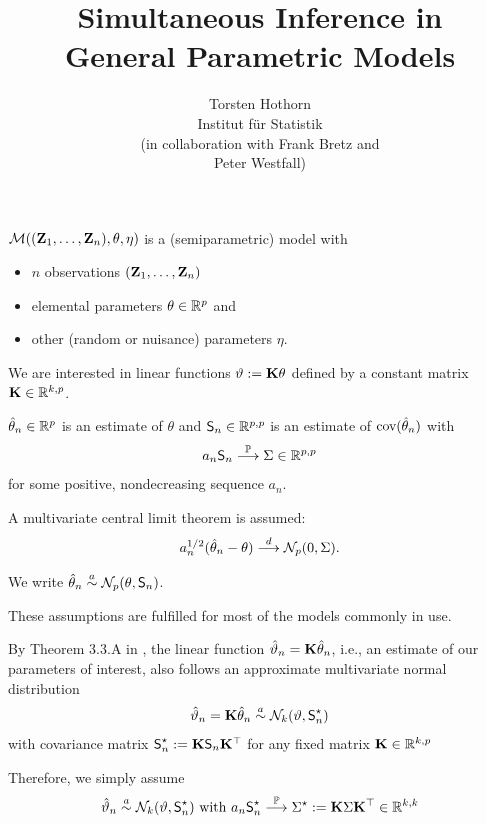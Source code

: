 \documentclass[landscape]{slides}
\title{Simultaneous Inference in \\ General Parametric Models}
\author{Torsten Hothorn \\ Institut für Statistik \\ 
(in collaboration with Frank Bretz and \\ Peter Westfall)}
\begin{document}
\maketitle



$\mathcal{M}((\mathbf{Z}_1, \dots, \mathbf{Z}_n), \theta, \eta)$ is a (semiparametric) model with

\begin{itemize}
\item $n$ observations $(\mathbf{Z}_1, \dots, \mathbf{Z}_n)$
\item elemental parameters $\theta \in \mathbb{R}^p$ and
\item other (random or nuisance) parameters $\eta$.
\end{itemize}

We are interested in linear functions $\vartheta := \mathbf{K} \theta$ defined
by a constant matrix $\mathbf{K} \in \mathbb{R}^{k, p}$.


$\hat{\theta}_n \in \mathbb{R}^p$ is an estimate of $\theta$ and
$\textsf{S}_n \in \mathbb{R}^{p,p}$ is an estimate of $\text{cov}(\hat{\theta}_n)$ with
\begin{eqnarray*}
a_n \textsf{S}_n \stackrel{\mathbb{P}}{\longrightarrow} \Sigma \in \mathbb{R}^{p,p}
\end{eqnarray*}
for some positive, nondecreasing sequence $a_n$.

A multivariate central limit theorem is assumed:
\begin{eqnarray*}
a_n^{1/2} (\hat{\theta}_n - \theta) \stackrel{d}{\longrightarrow} \mathcal{N}_p(0, \Sigma).
\end{eqnarray*}

We write $\hat{\theta}_n \stackrel{a}{\sim} \mathcal{N}_p(\theta, \textsf{S}_n)$.

These assumptions are fulfilled for most of the models commonly in use.


By Theorem 3.3.A in
\cite{Serfling1980}, the linear function $\hat{\vartheta}_n = \mathbf{K} 
\hat{\theta}_n$, i.e., an estimate of our parameters of interest,
also follows an approximate multivariate normal
distribution
\begin{eqnarray*}
\hat{\vartheta}_n = \mathbf{K} \hat{\theta}_n \stackrel{a}{\sim} \mathcal{N}_k(\vartheta, \textsf{S}^\star_n)
\end{eqnarray*}
with covariance matrix $\textsf{S}^\star_n := \mathbf{K} \textsf{S}_n \mathbf{K}^\top$
for any fixed matrix $\mathbf{K} \in \mathbb{R}^{k,p}$

Therefore, we simply assume
\begin{eqnarray*}
\hat{\vartheta}_n \stackrel{a}{\sim} \mathcal{N}_k(\vartheta, \textsf{S}^\star_n) \text{ with }
a_n \textsf{S}^\star_n \stackrel{\mathbb{P}}{\longrightarrow} \Sigma^\star := \mathbf{K} \Sigma \mathbf{K}^\top \in \mathbb{R}^{k,k}
\end{eqnarray*}
\end{document}
